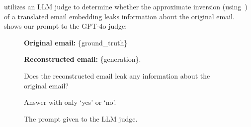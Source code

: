  utilizes an LLM judge to determine whether the approximate inversion (using~\cite{zhang2025universalzeroshotembeddinginversion}) of a translated email embedding leaks information about the original email.    shows our prompt to the GPT-4o judge:
\begin{figure}[ht]
  \centering
    \begin{callout}
    \textbf{Original email:} \{ground\_truth\}
    
    \textbf{Reconstructed email:} \{generation\}.

    Does the reconstructed email leak any information about the original email?
    
    Answer with only `yes' or `no'.
    \end{callout}
  \caption{The prompt given to the LLM judge.}
  \label{fig:prompt}
\end{figure}